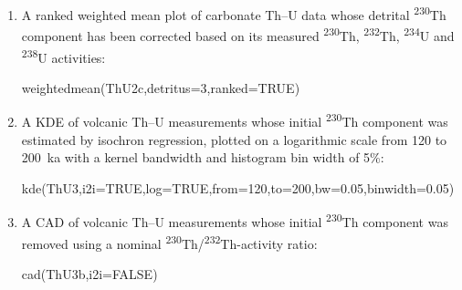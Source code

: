 \begin{refsection}
\begin{enumerate}
\item A ranked weighted mean plot of carbonate Th--U data whose
  detrital \textsuperscript{230}Th component has been corrected based
  on its measured \textsuperscript{230}Th, \textsuperscript{232}Th,
  \textsuperscript{234}U and \textsuperscript{238}U activities:

\begin{console}
weightedmean(ThU2c,detritus=3,ranked=TRUE)
\end{console}

\item A KDE of volcanic Th--U measurements whose initial
  \textsuperscript{230}Th component was estimated by isochron
  regression, plotted on a logarithmic scale from 120 to 200~ka with a
  kernel bandwidth and histogram bin width of 5\%:

\begin{console}
kde(ThU3,i2i=TRUE,log=TRUE,from=120,to=200,bw=0.05,binwidth=0.05)
\end{console}

\item A CAD of volcanic Th--U measurements whose initial
  \textsuperscript{230}Th component was removed using a nominal
  \textsuperscript{230}Th/\textsuperscript{232}Th-activity ratio:

\begin{console}
cad(ThU3b,i2i=FALSE)
\end{console}
  
\end{enumerate}

\printbibliography[heading=subbibliography]

\end{refsection}
